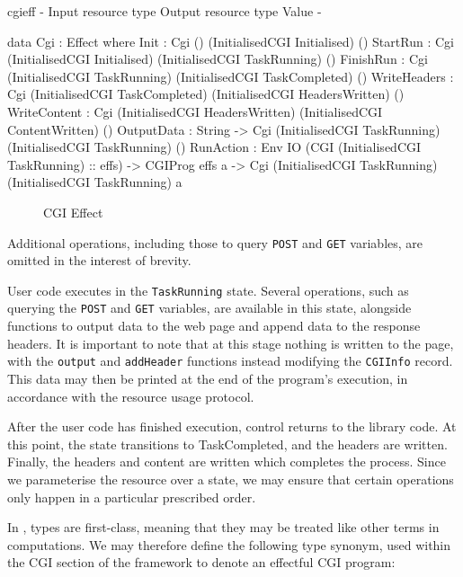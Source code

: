 \begin{SaveVerbatim}{cgieff}
{-                     { Input resource type }         { Output resource type }        { Value } -}

data Cgi : Effect where
    Init         : Cgi ()                              (InitialisedCGI Initialised)    ()
    StartRun     : Cgi (InitialisedCGI Initialised)    (InitialisedCGI TaskRunning)    ()
    FinishRun    : Cgi (InitialisedCGI TaskRunning)    (InitialisedCGI TaskCompleted)  ()
    WriteHeaders : Cgi (InitialisedCGI TaskCompleted)  (InitialisedCGI HeadersWritten) ()
    WriteContent : Cgi (InitialisedCGI HeadersWritten) (InitialisedCGI ContentWritten) ()
    OutputData   : String -> 
                   Cgi (InitialisedCGI TaskRunning)    (InitialisedCGI TaskRunning)    ()
    RunAction    : Env IO (CGI (InitialisedCGI TaskRunning) :: effs) -> CGIProg effs a -> 
                   Cgi (InitialisedCGI TaskRunning)    (InitialisedCGI TaskRunning)    a
\end{SaveVerbatim}

\begin{figure*}[t]
\begin{center}
\end{center}
\caption{CGI Effect}
\label{fig:cgieffect}
\end{figure*}

Additional operations, including those to query \texttt{POST} and \texttt{GET}
variables, are omitted in the interest of brevity.

User code executes in the \texttt{TaskRunning} state. Several operations, such
as querying the \texttt{POST} and \texttt{GET} variables, are available in this state, alongside
functions to output data to the web page and append data to the response
headers. It is important to note that at this stage nothing is written to the
page, with the \texttt{output} and \texttt{addHeader} functions instead
modifying the \texttt{CGIInfo} record. This data may then be printed at the end of the
program's execution, in accordance with the resource usage protocol.

After the user code has finished execution, control returns to the library
code. At this point, the state transitions to TaskCompleted, and the headers
are written.  Finally, the headers and content are written which completes the
process. Since we parameterise the resource over a state, we may ensure that
certain operations only happen in a particular prescribed order.

In \idris{}, types are first-class, meaning that they may be treated like other
terms in computations. We may therefore define the following type synonym, used
within the CGI section of the framework to denote an effectful CGI program: 

